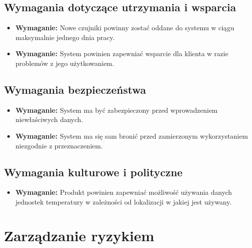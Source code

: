 \documentclass{article}
\begin{document}
\subsection{Wymagania dotyczące utrzymania i wsparcia}
\begin{itemize}
\item \textbf{Wymaganie:} Nowe czujniki powinny zostać oddane do systemu w ciągu maksymalnie jednego dnia pracy.\\
\end{itemize}
\begin{itemize}
\item \textbf{Wymaganie:} System powinien zapewniać wsparcie dla klienta w razie problemów z jego użytkowaniem.\\
\end{itemize}

\subsection{Wymagania bezpieczeństwa}
\begin{itemize}
\item \textbf{Wymaganie:} System ma być zabezpieczony przed wprowadzeniem niewłaściwych danych.\\
\end{itemize}
\begin{itemize}
\item \textbf{Wymaganie:} System ma się sam bronić przed zamierzonym wykorzystaniem niezgodnie z przeznaczeniem.\\
\end{itemize}

\subsection{Wymagania kulturowe i polityczne}
\begin{itemize}
\item \textbf{Wymaganie:} Produkt powinien zapewniać możliwość używania danych jednostek temperatury w zależności od lokalizacji w jakiej jest używany.\\
\end{itemize}


\section{Zarządzanie ryzykiem}
\end{document}
